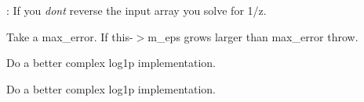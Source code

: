 
\begin{DoxyRefList}
\item[Class \mbox{\hyperlink{classemsr_1_1BairstowSolver}{emsr\+::Bairstow\+Solver$<$ Real $>$}} ]\label{todo__todo000003}%
%
\+: If you {\itshape don\textquotesingle{}t} reverse the input array you solve for 1/z. 

Take a max\+\_\+error. If this-\/$>$m\+\_\+eps grows larger than max\+\_\+error throw.  
\item[Member \mbox{\hyperlink{namespaceemsr_a3fc0119932c1b3a45cba25185cb951a7}{emsr\+::expm1}} (const std\+::complex$<$ Tp $>$ \&z)]\label{todo__todo000002}%
%
Do a better complex log1p implementation.  
\item[Member \mbox{\hyperlink{namespaceemsr_a14fd9693dd2a6a63599013938c3a76f7}{emsr\+::log1p}} (const std\+::complex$<$ Tp $>$ \&z)]\label{todo__todo000001}%
%
Do a better complex log1p implementation. 
\end{DoxyRefList}